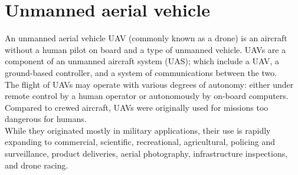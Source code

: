 \section{Unmanned aerial vehicle}
\label{sec:unmanned-aerial-vehicle}
%
%
An unmanned aerial vehicle UAV (commonly known as a drone) is an aircraft 
without a human pilot on board and a type of unmanned vehicle. 
UAVs are a component of an unmanned aircraft system (UAS); which include a UAV,
a ground-based controller, and a system of communications between the two.\\  
The flight of UAVs may operate with various degrees of autonomy: either under
remote control by a human operator or autonomously by on-board computers.
Compared to crewed aircraft, UAVs were originally used for missions too
dangerous for humans.\cite{budiansky2005air}\\
While they originated mostly in military applications, their use is rapidly
expanding to commercial, scientific, recreational, agricultural, policing and
surveillance, product deliveries, aerial photography, infrastructure
inspections, and drone racing.\cite{wiki:uav}
%
%
\begin{figure}[htb]
    \centering
     \\
    \label{fig:uavs-image}
\end{figure}
%
%
